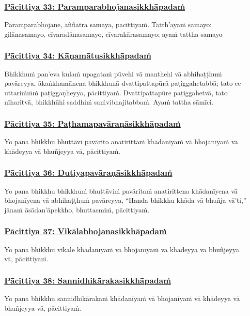 \subsubsection*{\hyperref[exp33]{Pācittiya 33: Paramparabhojanasikkhāpadaṁ}}
\label{pac33}
Paramparabhojane, aññatra samayā, pācittiyaṁ. Tatth'āyaṁ samayo: gilānasamayo, cīvaradānasamayo, cīvarakārasamayo; ayaṁ tattha samayo

\subsubsection*{\hyperref[exp34]{Pācittiya 34: Kāṇamātusikkhāpadaṁ}}
\label{pac34}
Bhikkhuṁ pan'eva kulaṁ upagataṁ pūvehi vā manthehi vā abhihaṭṭhuṁ pavāreyya, ākaṅkhamānena bhikkhunā dvattipattapūrā paṭiggahetabbā; tato ce uttariṁṁṁ paṭiggaṇheyya, pācittiyaṁ. Dvattipattapūre paṭiggahetvā, tato nīharitvā, bhikkhūhi saddhiṁ saṁvibhajitabbaṁ. Ayaṁ tattha sāmīci.

\subsubsection*{\hyperref[exp35]{Pācittiya 35: Paṭhamapavāraṇāsikkhāpadaṁ}}
\label{pac35}
Yo pana bhikkhu bhuttāvī pavārito anatirittaṁ khādanīyaṁ vā bhojanīyaṁ vā khādeyya vā bhuñjeyya vā, pācittiyaṁ.

\subsubsection*{\hyperref[exp36]{Pācittiya 36: Dutiyapavāraṇāsikkhāpadaṁ}}
\label{pac36}
Yo pana bhikkhu bhikkhuṁ bhuttāviṁ pavāritaṁ anatirittena khādanīyena vā bhojanīyena vā abhihaṭṭhuṁ pavāreyya, ``Handa bhikkhu khāda vā bhuñja vā'ti,'' jānaṁ āsādan'āpekkho, bhuttasmiṁ, pācittiyaṁ.

\subsubsection*{\hyperref[exp37]{Pācittiya 37: Vikālabhojanasikkhāpadaṁ}}
\label{pac37}
Yo pana bhikkhu vikāle khādanīyaṁ vā bhojanīyaṁ vā khādeyya vā bhuñjeyya vā, pācittiyaṁ.

\subsubsection*{\hyperref[exp38]{Pācittiya 38: Sannidhikārakasikkhāpadaṁ}}
\label{pac38}
Yo pana bhikkhu sannidhikārakaṁ khādanīyaṁ vā bhojanīyaṁ vā khādeyya vā bhuñjeyya vā, pācittiyaṁ.

